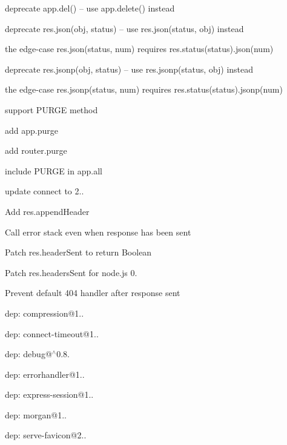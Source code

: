 {\ttfamily 
\begin{DoxyItemize}
\item deprecate {\ttfamily app.\+del()} -- use {\ttfamily app.\+delete()} instead
\item deprecate {\ttfamily res.\+json(obj, status)} -- use {\ttfamily res.\+json(status, obj)} instead
\begin{DoxyItemize}
\item the edge-\/case {\ttfamily res.\+json(status, num)} requires {\ttfamily res.\+status(status).json(num)}
\end{DoxyItemize}
\item deprecate {\ttfamily res.\+jsonp(obj, status)} -- use {\ttfamily res.\+jsonp(status, obj)} instead
\begin{DoxyItemize}
\item the edge-\/case {\ttfamily res.\+jsonp(status, num)} requires {\ttfamily res.\+status(status).jsonp(num)}
\end{DoxyItemize}
\item support P\+U\+R\+GE method
\begin{DoxyItemize}
\item add {\ttfamily app.\+purge}
\item add {\ttfamily router.\+purge}
\item include P\+U\+R\+GE in {\ttfamily app.\+all}
\end{DoxyItemize}
\item update connect to 2..
\begin{DoxyItemize}
\item Add {\ttfamily res.\+append\+Header}
\item Call error stack even when response has been sent
\item Patch {\ttfamily res.\+header\+Sent} to return Boolean
\item Patch {\ttfamily res.\+headers\+Sent} for node.\+js 0.
\item Prevent default 404 handler after response sent
\item dep\+: compression@1..
\item dep\+: connect-\/timeout@1..
\item dep\+: debug@$^\wedge$0.8.
\item dep\+: errorhandler@1..
\item dep\+: express-\/session@1..
\item dep\+: morgan@1..
\item dep\+: serve-\/favicon@2..

\end{DoxyItemize}
\end{DoxyItemize}}

